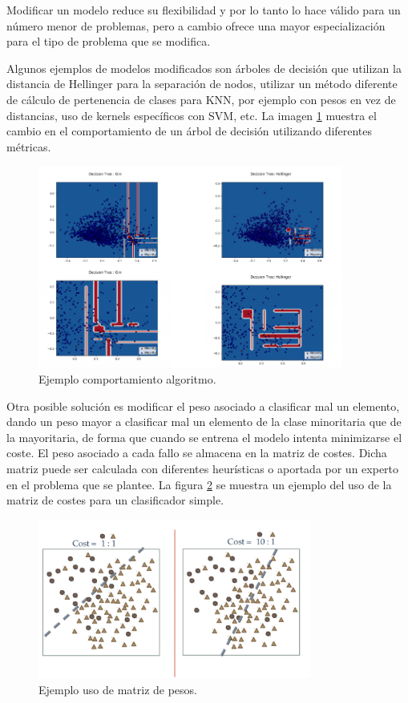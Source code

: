 Modificar un modelo reduce su flexibilidad y por lo tanto lo hace válido para un número menor de problemas, pero a cambio ofrece una mayor especialización para el tipo de problema que se modifica.\newline

Algunos ejemplos de modelos modificados son árboles de decisión que utilizan la distancia de Hellinger para la separación de nodos, utilizar un método diferente de cálculo de pertenencia de clases para KNN, por ejemplo con pesos en vez de distancias, uso de kernels específicos con SVM, etc. La imagen \ref{fig:25} muestra el cambio en el comportamiento de un árbol de decisión utilizando diferentes métricas.\newline

\begin{figure}[H]
	\centering
	\includegraphics[width=100mm]{imagenes/hellinger-example.png}
	\caption{Ejemplo comportamiento algoritmo.}
	\label{fig:25}
\end{figure}
\verticalspace

Otra posible solución es modificar el peso asociado a clasificar mal un elemento, dando un peso mayor a clasificar mal un elemento de la clase minoritaria que de la mayoritaria, de forma que cuando se entrena el modelo intenta minimizarse el coste. El peso asociado a cada fallo se almacena en la matriz de costes. Dicha matriz puede ser calculada con diferentes heurísticas o aportada por un experto en el problema que se plantee. La figura \ref{fig:26} se muestra un ejemplo del uso de la matriz de costes para un clasificador simple.\newline

\begin{figure}[H]
	\centering
	\includegraphics[width=90mm]{imagenes/cost-sentitive.png}
	\caption{Ejemplo uso de matriz de pesos.}
	\label{fig:26}
\end{figure}
\verticalspace

